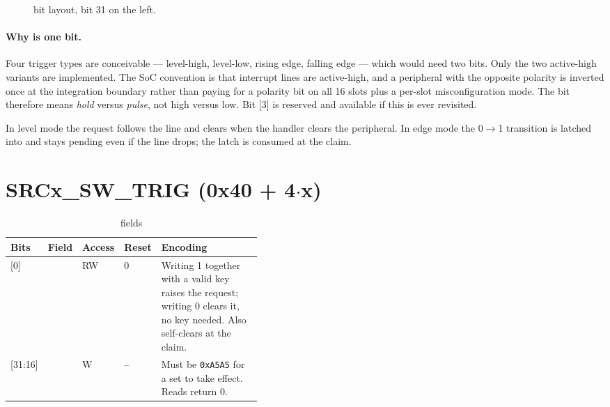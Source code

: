 \begin{figure}[H]
\centering
{}
\caption{ bit layout, bit 31 on the left.}
\label{fig:srccfgbits}
\end{figure}

\paragraph{Why  is one bit.} Four trigger types are conceivable ---
level-high, level-low, rising edge, falling edge --- which would need two bits.
Only the two active-high variants are implemented. The SoC convention is that
interrupt lines are active-high, and a peripheral with the opposite polarity is
inverted once at the integration boundary rather than paying for a polarity bit
on all 16 slots plus a per-slot misconfiguration mode. The bit therefore means
\emph{hold} versus \emph{pulse}, not high versus low. Bit [3] is reserved and
available if this is ever revisited.

In level mode the request follows the line and clears when the handler clears the
peripheral. In edge mode the 0$\to$1 transition is latched into 
and stays pending even if the line drops; the latch is consumed at the claim.

\section{SRCx\_SW\_TRIG (0x40 + 4$\cdot$x)}

\begin{table}[H]
\centering
\caption{ fields}
\label{tab:swtrig}
\begin{tabular}{@{}llllL{0.42\linewidth}@{}}
\toprule
\textbf{Bits} & \textbf{Field} & \textbf{Access} & \textbf{Reset} & \textbf{Encoding} \\
\midrule
{[0]}       &  & RW & 0 & Writing 1 together with a valid key raises the request; writing 0 clears it, no key needed. Also self-clears at the claim. \\
{[31:16]} &    & W  & -- & Must be \texttt{0xA5A5} for a set to take effect. Reads return 0. \\
\bottomrule
\end{tabular}
\end{table}

